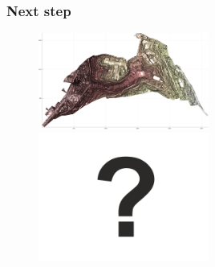 \documentclass[xcolor=dvipsnames, USenglish]{beamer}  %
\begin{document}
  \begin{frame}
    \frametitle{Next step}
     \begin{figure}[t]
        \includegraphics[width=0.5\textwidth]{img/coimbra.png}
        \includegraphics[width=0.5\textwidth]{img/question.png}
      \end{figure}
  \end{frame}
\end{document}
